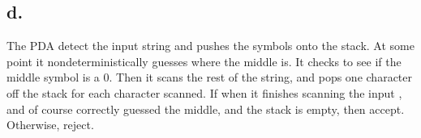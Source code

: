 \documentclass{scrartcl}
\begin{document}
\subsection*{d.}
The PDA detect the input string and pushes the symbols onto the stack. At some point it nondeterministically guesses where the middle is. It checks to see if the middle symbol is a 0. Then it scans the rest of the string, and pops one character off the stack for each character scanned. If when it finishes scanning the input , and of course correctly guessed the middle, and the stack is empty, then accept. Otherwise, reject.\\
\\
\\
\end{document}
